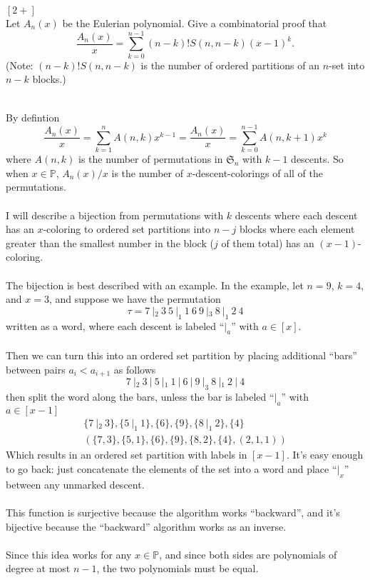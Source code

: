 \documentclass{article}
\newenvironment{problem}[2][Problem]{\begin{trivlist}
\item[\hskip \labelsep {\bfseries #1}\hskip \labelsep {\bfseries #2.}]}{\end{trivlist}}
\newenvironment{solution}[1][Solution.]{\begin{trivlist}
\item[\hskip \labelsep {\bfseries #1}]}{\end{trivlist}}
\begin{document}
\pagebreak
\begin{problem}{133b} $[2+]$ \\
  Let $A_n(x)$ be the Eulerian polynomial. Give a combinatorial proof that \[
    \frac{A_n(x)}{x} = \sum_{k=0}^{n-1} (n-k)! S(n, n-k)(x - 1)^k.
  \]
  (Note: $(n-k)!S(n, n-k)$ is the number of ordered partitions of an $n$-set
  into $n-k$ blocks.)
\end{problem}

\begin{solution} \text{} \\
  By defintion \[
    \frac{A_n(x)}{x} = \sum_{k=1}^n A(n, k) x^{k - 1} = \frac{A_n(x)}{x} = \sum_{k=0}^{n-1} A(n, k+1) x^k
  \] where $A(n, k)$ is the number of permutations in $\mathfrak S_n$ with
  $k - 1$ descents. So when $x \in \mathbb P$, $A_n(x)/x$ is the number of
  $x$-descent-colorings of all of the permutations.
  \\~\\
  I will describe a bijection from permutations with $k$ descents where each
  descent has an $x$-coloring to ordered set partitions into $n - j$ blocks
  where each element greater than the smallest number in the block
  ($j$ of them total)
  has an $(x-1)$-coloring.
  \\~\\ The bijection is best described with an example. In the example,
  let $n = 9$, $k = 4$, and $x = 3$, and suppose we have the permutation \[
    \tau = 7\ |_2\ 3\ 5\ |_1\ 1\ 6\ 9\ |_3\ 8\ |_1\ 2\ 4
  \] written as a word, where each descent is labeled ``$|_a$'' with $a \in [x]$.
  \\~\\
  Then we can turn this into an ordered set partition by placing additional
  ``bars'' between pairs $a_i < a_{i + 1}$ as follows \[
    7\ |_2\ 3\ |\ 5\ |_1\ 1\ |\ 6\ |\ 9\ |_3\ 8\ |_1\ 2\ |\ 4
  \] then split the word along the bars, unless the bar is labeled ``$|_a$''
  with $a \in [x-1]$ \begin{align*}
    \{7\ |_2\ 3\},
    \{5\ |_1\ 1\},
    \{6\},
    \{9\},
    \{8\ |_1\ 2\},
    \{4\}\\
    (\{7, 3\},
    \{5, 1\},
    \{6\},
    \{9\},
    \{8, 2\},
    \{4\}, (2, 1, 1))
  \end{align*}
  Which results in an ordered set partition with labels in $[x - 1]$.
  It's easy enough to go back: just concatenate the elements of the set into a
  word and place ``$|_x$'' between any unmarked descent.
  \\~\\
  This function is surjective because the algorithm works ``backward'',
  and it's bijective because the ``backward'' algorithm works as an inverse.
  \\~\\
  Since this idea works for any $x \in \mathbb P$, and since both sides are
  polynomials of degree at most $n-1$, the two polynomials must be equal.
\end{solution}
\end{document}
